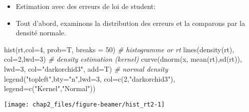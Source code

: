 \documentclass[
  ignorenonframetext,
]{beamer}
\newenvironment{Shaded}{\begin{snugshade}}{\end{snugshade}}
\newcommand{\AttributeTok}[1]{\textcolor[rgb]{0.77,0.63,0.00}{#1}}
\newcommand{\CommentTok}[1]{\textcolor[rgb]{0.56,0.35,0.01}{\textit{#1}}}
\newcommand{\DecValTok}[1]{\textcolor[rgb]{0.00,0.00,0.81}{#1}}
\newcommand{\FunctionTok}[1]{\textcolor[rgb]{0.00,0.00,0.00}{#1}}
\newcommand{\NormalTok}[1]{#1}
\newcommand{\StringTok}[1]{\textcolor[rgb]{0.31,0.60,0.02}{#1}}
\begin{document}
\begin{frame}[fragile]
\begin{itemize}[<+->]
\item
  Estimation avec des erreurs de loi de student:
\item
  Tout d'abord, examinons la distribution des erreurs et la comparons
  par la densité normale.
\end{itemize}

\begin{Shaded}
\begin{Highlighting}[]
\FunctionTok{hist}\NormalTok{(rt,}\AttributeTok{col=}\DecValTok{4}\NormalTok{, }\AttributeTok{prob=}\NormalTok{T, }\AttributeTok{breaks =} \DecValTok{50}\NormalTok{) }\CommentTok{\# histogramme or rt}
\FunctionTok{lines}\NormalTok{(}\FunctionTok{density}\NormalTok{(rt), }\AttributeTok{col=}\DecValTok{2}\NormalTok{,}\AttributeTok{lwd=}\DecValTok{3}\NormalTok{) }\CommentTok{\# density estimation (kernel)}
\FunctionTok{curve}\NormalTok{(}\FunctionTok{dnorm}\NormalTok{(x, }\FunctionTok{mean}\NormalTok{(rt),}\FunctionTok{sd}\NormalTok{(rt)), }\AttributeTok{lwd=}\DecValTok{3}\NormalTok{, }\AttributeTok{col=}\StringTok{"darkorchid3"}\NormalTok{, }\AttributeTok{add=}\NormalTok{T) }\CommentTok{\# normal density}
\FunctionTok{legend}\NormalTok{(}\StringTok{"topleft"}\NormalTok{,}\AttributeTok{bty=}\StringTok{"n"}\NormalTok{,}\AttributeTok{lwd=}\DecValTok{3}\NormalTok{, }\AttributeTok{col=}\FunctionTok{c}\NormalTok{(}\DecValTok{2}\NormalTok{,}\StringTok{"darkorchid3"}\NormalTok{),}
       \AttributeTok{legend=}\FunctionTok{c}\NormalTok{(}\StringTok{"Kernel"}\NormalTok{,}\StringTok{"Normal"}\NormalTok{))}
\end{Highlighting}
\end{Shaded}
\end{frame}

\begin{frame}
\begin{center}\texttt{[image: chap2\_files/figure-beamer/hist\_rt2-1]} \end{center}
\end{frame}
\end{document}
